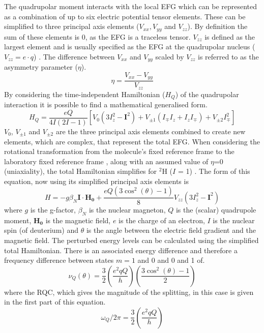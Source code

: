 The quadrupolar moment interacts with the local \ac{EFG} which can be represented as a combination of up to six electric potential tensor elements. These can be simplified to three principal axis elements ($V_{xx}, V_{yy}$ and $V_{zz}$). By definition the sum of these elements is 0, as the \ac{EFG} is a traceless tensor. $V_{zz}$ is defined as the largest element and is usually specified as the \ac{EFG} at the quadrupolar nucleus ($V_{zz} = e\cdot q$) \cite{Elliott2021WhatMedia}. The difference between $V_{xx}$ and $V_{yy}$ scaled by $V_{zz}$ is referred to as the asymmetry parameter ($\eta$).
\begin{equation}
    \eta = \frac{V_{xx}-V_{yy}}{V_{zz}}
\end{equation}
By considering the time-independent Hamiltonian ($H_Q$) of the quadrupolar interaction it is possible to find a mathematical generalised form.
\begin{equation}
    H_Q = \frac{eQ}{4I(2I-1)}[V_0(3I^2_z-\boldsymbol{I}^2) + V_{\pm1}(I_{\mp}I_z+I_zI_\mp)+V_{\pm2}I^2_\mp]
\end{equation}
$V_0$, $V_{\pm1}$ and $V_{\pm2}$ are the three principal axis elements combined to create new elements, which are complex, that represent the total \ac{EFG}. When considering the rotational transformation from the molecule's fixed reference frame to the laboratory fixed reference frame \cite{Seelig1977DeuteriumMembranes}, along with an assumed value of $\eta$=0 (uniaxiality), the total Hamiltonian simplifies for $^2$H ($I$ = 1)  \cite{Sharf1995DetectionNMR-Spectroscopy}. The form of this equation, now using its simplified principal axis elements is
\begin{equation}
    H = -g\beta_N\boldsymbol{I}\cdot\boldsymbol{H_0} + \frac{eQ(3\cos^2(\theta)-1)}{8}V_{zz}(3I_z^2-\boldsymbol{I}^2)
\end{equation}
where $g$ is the g-factor, $\beta_N$ is the nuclear magneton, $Q$ is the (scalar) quadrupole moment, $\boldsymbol{H_0}$ is the magnetic field, $e$ is the charge of an electron, $I$ is the nuclear spin (of deuterium) and $\theta$ is the angle between the electric field gradient and the magnetic field. The perturbed energy levels can be calculated using the simplified total Hamiltonian. There is an associated energy difference and therefore a frequency difference between states $m=1$ and 0 and 0 and 1 of.
\begin{equation}
    \nu_Q(\theta) = \frac{3}{2}\left(\frac{e^2qQ}{h}\right)\left(\frac{3\cos^2(\theta)-1}{2}\right)
    \label{eqn:Quad:Angle}
\end{equation}
where the \ac{RQC}, which gives the magnitude of the splitting, in this case is given in the first part of this equation.
\begin{equation}
    \omega_Q/2\pi = \frac{3}{2}\left(\frac{e^2qQ}{h}\right)
    \label{eqn:Quad:RQC}
\end{equation}

